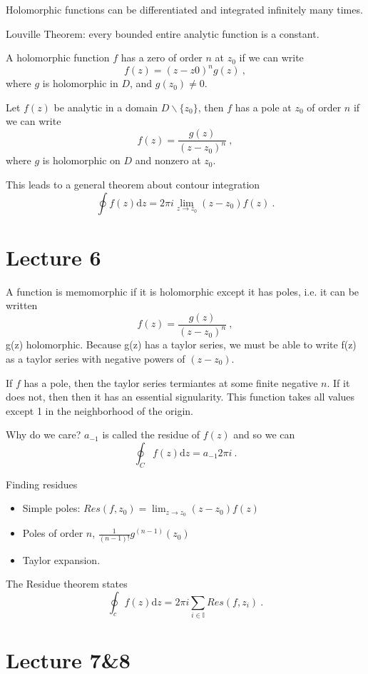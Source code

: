\documentclass[11pt, a4paper]{Article}
\begin{document}
Holomorphic functions can be differentiated and integrated infinitely many times.

Louville Theorem: every bounded entire analytic function is a constant.

A holomorphic function $f$ has a zero of order $n$ at $z_0$ if we can write
$$
	f(z) = (z-z0)^ng(z)~,
$$
where $g$ is holomorphic in $D$, and $g(z_0) \neq 0$.

Let $f(z)$ be analytic in a domain $D \backslash \{z_0\}$, then $f$ has a pole at $z_0$ of order $n$ if we can write
$$
	f(z) = \frac{g(z)}{(z-z_0)^n}~,
$$
where $g$ is holomorphic on $D$ and nonzero at $z_0$.

This leads to a general theorem about contour integration
$$
	\oint f(z) \mathrm{d}z = 2\pi i \lim_{z\rightarrow z_0} (z-z_0)f(z)~.
$$

\section{Lecture 6}

A function is memomorphic if it is holomorphic except it has poles, i.e. it can be written
$$
	f(z) = \frac{g(z)}{(z-z_0)^n}~,
$$
g(z) holomorphic. Because g(z) has a taylor series, we must be able to write f(z) as a taylor series with negative powers of $(z-z_0)$.

If $f$ has a pole, then the taylor series termiantes at some finite negative $n$.
If it does not, then then it has an essential signularity. This function takes all values except 1 in the neighborhood of the origin.

Why do we care? $a_{-1}$ is called the residue of $f(z)$ and so we can 
$$
	\oint_C f(z) \mathrm{d}z = a_{-1} 2 \pi i~.
$$

Finding residues
\begin{itemize}
	\item Simple poles: $Res(f, z_0) = \lim_{z\rightarrow z_0} (z-z_0) f(z)$
	\item Poles of order $n$, $\frac{1}{(n-1)!} g^{(n-1)}(z_0)$
	\item Taylor expansion.
\end{itemize}

The Residue theorem states
$$
	\oint_c f(z) \mathrm{d}z = 2\pi i \sum_{i\in \mathbb{I}} Res(f, z_i)~.
$$

\section{Lecture 7&8}
\end{document}
